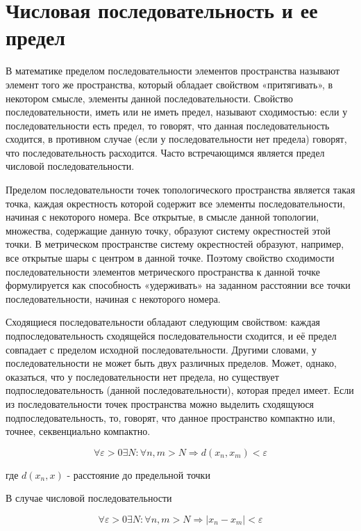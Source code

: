 \section{Числовая последовательность и ее предел}

В математике пределом последовательности элементов пространства называют элемент того же пространства, который обладает свойством «притягивать», в некотором смысле, элементы данной последовательности. Свойство последовательности, иметь или не иметь предел, называют сходимостью: если у последовательности есть предел, то говорят, что данная последовательность сходится, в противном случае (если у последовательности нет предела) говорят, что последовательность расходится. Часто встречающимся является предел числовой последовательности.

Пределом последовательности точек топологического пространства является такая точка, каждая окрестность которой содержит все элементы последовательности, начиная с некоторого номера. Все открытые, в смысле данной топологии, множества, содержащие данную точку, образуют систему окрестностей этой точки. В метрическом пространстве систему окрестностей образуют, например, все открытые шары с центром в данной точке. Поэтому свойство сходимости последовательности элементов метрического пространства к данной точке формулируется как способность «удерживать» на заданном расстоянии все точки последовательности, начиная с некоторого номера.

Сходящиеся последовательности обладают следующим свойством: каждая подпоследовательность сходящейся последовательности сходится, и её предел совпадает с пределом исходной последовательности. Другими словами, у последовательности не может быть двух различных пределов. Может, однако, оказаться, что у последовательности нет предела, но существует подпоследовательность (данной последовательности), которая предел имеет. Если из последовательности точек пространства можно выделить сходящуюся подпоследовательность, то, говорят, что данное пространство компактно или, точнее, секвенциально компактно.

$$
\forall \varepsilon > 0 \exists N: \forall n,m > N \Rightarrow d(x_n, x_m) < \varepsilon
$$

где $d(x_n, x)$ - расстояние до предельной точки

В случае числовой последовательности

$$
\forall \varepsilon > 0 \exists N: \forall n,m > N \Rightarrow |x_{n} - x_{m}| < \varepsilon
$$